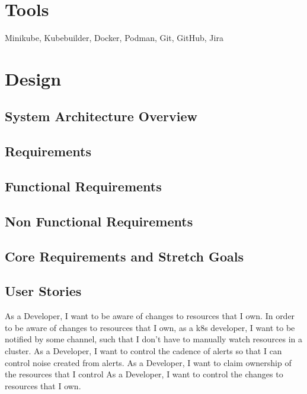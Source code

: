\documentclass{article}
\begin{document}
\section{Tools}
Minikube, Kubebuilder, Docker, Podman, Git, GitHub, Jira


\section{Design}



\subsection{System Architecture Overview}



\subsection{Requirements}



\subsection{Functional Requirements}



\subsection{Non Functional Requirements}



\subsection{Core Requirements and Stretch Goals}



\subsection{User Stories}
As a Developer, I want to be aware of changes to resources that I own.
In order to be aware of changes to resources that I own, as a k8s developer, I want to be notified by some channel, such that I don’t have to manually watch resources in a cluster.
As a Developer, I want to control the cadence of alerts so that I can control noise created from alerts.
As a Developer, I want to claim ownership of the resources that I control
As a Developer, I want to control the changes to resources that I own.
\end{document}
